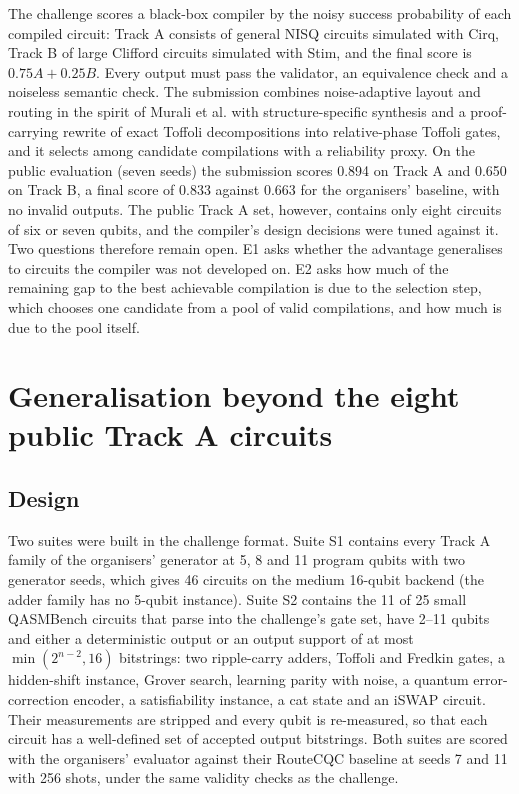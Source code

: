 The challenge scores a black-box compiler by the noisy success probability of each compiled circuit: Track A consists of general NISQ circuits simulated with Cirq, Track B of large Clifford circuits simulated with Stim\cite{stim}, and the final score is $0.75A+0.25B$. Every output must pass the validator, an equivalence check and a noiseless semantic check. The submission combines noise-adaptive layout and routing in the spirit of Murali et al.\cite{murali} with structure-specific synthesis and a proof-carrying rewrite of exact Toffoli decompositions into relative-phase Toffoli gates\cite{maslov}, and it selects among candidate compilations with a reliability proxy. On the public evaluation (seven seeds) the submission scores 0.894 on Track A and 0.650 on Track B, a final score of 0.833 against 0.663 for the organisers' baseline, with no invalid outputs. The public Track A set, however, contains only eight circuits of six or seven qubits, and the compiler's design decisions were tuned against it. Two questions therefore remain open. E1 asks whether the advantage generalises to circuits the compiler was not developed on. E2 asks how much of the remaining gap to the best achievable compilation is due to the selection step, which chooses one candidate from a pool of valid compilations, and how much is due to the pool itself.

\section{Generalisation beyond the eight public Track A circuits}

\subsection{Design}
Two suites were built in the challenge format. Suite S1 contains every Track A family of the organisers' generator at 5, 8 and 11 program qubits with two generator seeds, which gives 46 circuits on the medium 16-qubit backend (the adder family has no 5-qubit instance). Suite S2 contains the 11 of 25 small QASMBench circuits\cite{qasmbench} that parse into the challenge's gate set, have 2--11 qubits and either a deterministic output or an output support of at most $\min(2^{n-2},16)$ bitstrings: two ripple-carry adders\cite{cuccaro}, Toffoli and Fredkin gates, a hidden-shift instance, Grover search, learning parity with noise, a quantum error-correction encoder, a satisfiability instance, a cat state and an iSWAP circuit. Their measurements are stripped and every qubit is re-measured, so that each circuit has a well-defined set of accepted output bitstrings. Both suites are scored with the organisers' evaluator against their RouteCQC baseline at seeds 7 and 11 with 256 shots, under the same validity checks as the challenge.

